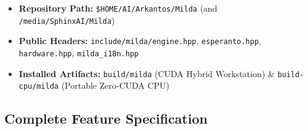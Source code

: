 \documentclass[11pt,a4paper]{article}
\begin{document}
\begin{itemize}[leftmargin=1.5em,itemsep=1pt]
  \item \textbf{Repository Path:} \texttt{\$HOME/AI/Arkantos/Milda} (and \texttt{/media/SphinxAI/Milda})
  \item \textbf{Public Headers:} \texttt{include/milda/engine.hpp}, \texttt{esperanto.hpp}, \texttt{hardware.hpp}, \texttt{milda\_i18n.hpp}
  \item \textbf{Installed Artifacts:} \texttt{build/milda} (CUDA Hybrid Workstation) \& \texttt{build-cpu/milda} (Portable Zero-CUDA CPU)
\end{itemize}

\subsection{Complete Feature Specification}
\end{document}

